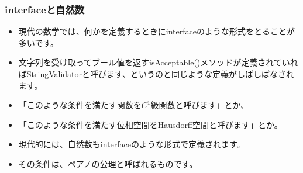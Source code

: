 \documentclass[dvipdfmx]{beamer}
\begin{document}



  \begin{frame}
    \frametitle{interfaceと自然数}

    \begin{itemize}
      \item 現代の数学では、何かを定義するときにinterfaceのような形式をとることが多いです。
      \item 文字列を受け取ってブール値を返すisAcceptable()メソッドが定義されていればStringValidatorと呼びます、というのと同じような定義がしばしばなされます。

      \pause

      \item 「このような条件を満たす関数を$C^1$級関数と呼びます」とか、
      \item 「このような条件を満たす位相空間をHausdorff空間と呼びます」とか。

      \pause

      \item 現代的には、自然数もinterfaceのような形式で定義されます。
      \item その条件は、ペアノの公理と呼ばれるものです。
    \end{itemize}

  \end{frame}
\end{document}
